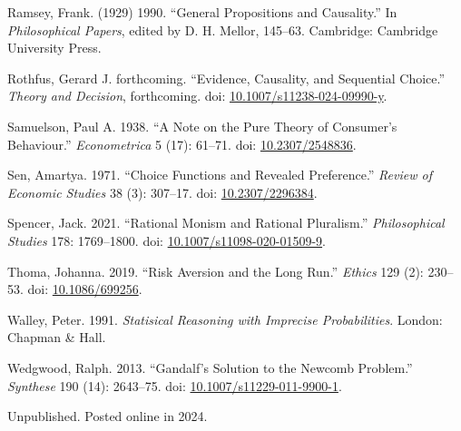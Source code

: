 \documentclass[
  10pt,
  letterpaper,
  DIV=11,
  numbers=noendperiod,
  twoside]{scrartcl}
\newlength{\cslhangindent}
\newenvironment{CSLReferences}[2] %
 {\begin{list}{}{%
  \setlength{\itemindent}{0pt}
  \setlength{\leftmargin}{0pt}
  \setlength{\parsep}{0pt}
  \ifodd #1
   \setlength{\leftmargin}{\cslhangindent}
   \setlength{\itemindent}{-1\cslhangindent}
  \fi
  \setlength{\itemsep}{#2\baselineskip}}}
 {\end{list}}
\begin{document}
\begin{CSLReferences}{1}{0}
Ramsey, Frank. (1929) 1990. {``General Propositions and Causality.''} In
\emph{Philosophical Papers}, edited by D. H. Mellor, 145--63. Cambridge:
Cambridge University Press.

Rothfus, Gerard J. forthcoming. {``Evidence, Causality, and Sequential
Choice.''} \emph{Theory and Decision}, forthcoming. doi:
\href{https://doi.org/10.1007/s11238-024-09990-y}{10.1007/s11238-024-09990-y}.

Samuelson, Paul A. 1938. {``A Note on the Pure Theory of Consumer's
Behaviour.''} \emph{Econometrica} 5 (17): 61--71. doi:
\href{https://doi.org/10.2307/2548836}{10.2307/2548836}.

Sen, Amartya. 1971. {``Choice Functions and Revealed Preference.''}
\emph{Review of Economic Studies} 38 (3): 307--17. doi:
\href{https://doi.org/10.2307/2296384}{10.2307/2296384}.

Spencer, Jack. 2021. {``Rational Monism and Rational Pluralism.''}
\emph{Philosophical Studies} 178: 1769--1800. doi:
\href{https://doi.org/10.1007/s11098-020-01509-9}{10.1007/s11098-020-01509-9}.

Thoma, Johanna. 2019. {``Risk Aversion and the Long Run.''}
\emph{Ethics} 129 (2): 230--53. doi:
\href{https://doi.org/10.1086/699256}{10.1086/699256}.

Walley, Peter. 1991. \emph{Statisical Reasoning with Imprecise
Probabilities}. London: Chapman \& Hall.

Wedgwood, Ralph. 2013. {``Gandalf's Solution to the Newcomb Problem.''}
\emph{Synthese} 190 (14): 2643--75. doi:
\href{https://doi.org/10.1007/s11229-011-9900-1}{10.1007/s11229-011-9900-1}.

\end{CSLReferences}



\noindent Unpublished. Posted online in 2024.
\end{document}
